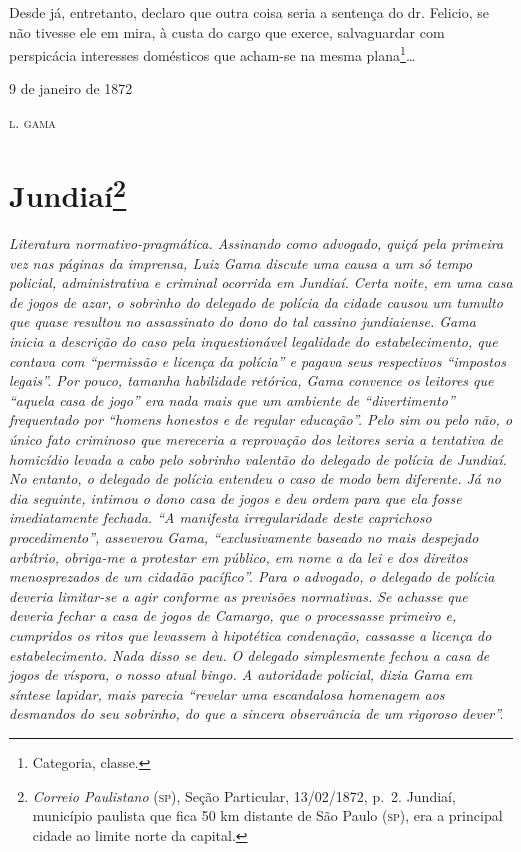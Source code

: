 Desde já, entretanto, declaro que outra coisa seria a sentença do dr.
Felicio, se não tivesse ele em mira, à custa do cargo que exerce,
salvaguardar com perspicácia interesses domésticos que acham-se na mesma
plana\footnote{ Categoria, classe.}\ldots{}

\begin{flushright}
9 de janeiro de 1872

\textsc{l. gama}
\end{flushright}

\chapter{Jundiaí\footnote{\emph{Correio Paulistano} (\textsc{sp}), Seção Particular,
  13/02/1872, p.~2. Jundiaí, município paulista que fica 50 km distante
  de São Paulo (\textsc{sp}), era a principal cidade ao limite norte da capital.} }%

\begin{didascalia}
\emph{Literatura normativo-pragmática. Assinando como advogado, quiçá
pela primeira vez nas páginas da imprensa, Luiz Gama discute uma causa a
um só tempo policial, administrativa e criminal ocorrida em Jundiaí.
Certa noite, em uma casa de jogos de azar, o sobrinho do delegado de
polícia da cidade causou um tumulto que quase resultou no assassinato do
dono do tal cassino jundiaiense. Gama inicia a descrição do caso pela
inquestionável legalidade do estabelecimento, que contava com ``permissão
e licença da polícia'' e pagava seus respectivos ``impostos legais''. Por
pouco, tamanha habilidade retórica, Gama convence os leitores que
``aquela casa de jogo'' era nada mais que um ambiente de ``divertimento''
frequentado por ``homens honestos e de regular educação''. Pelo sim ou
pelo não, o único fato criminoso que mereceria a reprovação dos leitores
seria a tentativa de homicídio levada a cabo pelo sobrinho valentão do
delegado de polícia de Jundiaí. No entanto, o delegado de polícia
entendeu o caso de modo bem diferente. Já no dia seguinte, intimou o
dono casa de jogos e deu ordem para que ela fosse imediatamente fechada.
``A manifesta irregularidade deste caprichoso procedimento'', asseverou
Gama, ``exclusivamente baseado no mais despejado arbítrio, obriga-me a
protestar em público, em nome a da lei e dos direitos menosprezados de
um cidadão pacífico''. Para o advogado, o delegado de polícia deveria
limitar-se a agir conforme as previsões normativas. Se achasse que
deveria fechar a casa de jogos de Camargo, que o processasse primeiro e,
cumpridos os ritos que levassem à hipotética condenação, cassasse a
licença do estabelecimento. Nada disso se deu. O delegado simplesmente
fechou a casa de jogos de víspora, o nosso atual bingo. A autoridade
policial, dizia Gama em síntese lapidar, mais parecia ``revelar uma
escandalosa homenagem aos desmandos do seu sobrinho, do que a sincera
observância de um rigoroso dever''.}
\end{didascalia}

